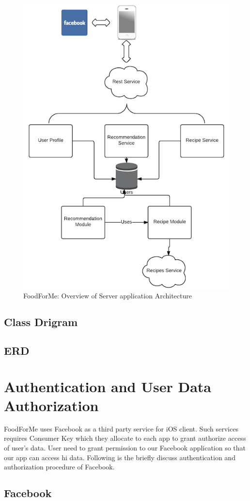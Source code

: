 	\begin{figure}[h]
	   	\centering
	   	\includegraphics[width=.55\linewidth]{figures/ch4_architechture_diagram.png}
	   	\caption{FoodForMe: Overview of Server application Architecture}
	   	\label{fig:ch4_architechture_diagram.png}
	   \end{figure}
	   
\subsection{Class Drigram}

\subsection{ERD}

\section{Authentication and User Data Authorization}

FoodForMe uses Facebook as a third party service for iOS client. Such services requires Consumer Key which they allocate to each app to grant authorize access of user’s data. User need to grant permission to our Facebook application so that our app can access hi data.  Following is the briefly discuss authentication and authorization procedure of Facebook.

\subsection{Facebook}

